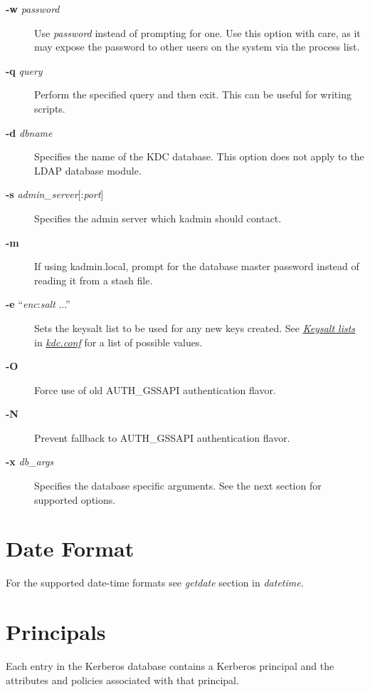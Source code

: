 \documentclass[letterpaper,10pt,english]{sphinxmanual}
\begin{document}
\begin{description}
\item[{\textbf{-w} \emph{password}}] \leavevmode
Use \emph{password} instead of prompting for one.  Use this option with
care, as it may expose the password to other users on the system
via the process list.

\item[{\textbf{-q} \emph{query}}] \leavevmode
Perform the specified query and then exit.  This can be useful for
writing scripts.

\item[{\textbf{-d} \emph{dbname}}] \leavevmode
Specifies the name of the KDC database.  This option does not
apply to the LDAP database module.

\item[{\textbf{-s} \emph{admin\_server}{[}:\emph{port}{]}}] \leavevmode
Specifies the admin server which kadmin should contact.

\item[{\textbf{-m}}] \leavevmode
If using kadmin.local, prompt for the database master password
instead of reading it from a stash file.

\item[{\textbf{-e} ``\emph{enc}:\emph{salt} ...''}] \leavevmode
Sets the keysalt list to be used for any new keys created.  See
{\hyperref[admin/conf_files/kdc_conf:keysalt-lists]{\emph{Keysalt lists}}} in {\hyperref[admin/conf_files/kdc_conf:kdc-conf-5]{\emph{kdc.conf}}} for a list of possible
values.

\item[{\textbf{-O}}] \leavevmode
Force use of old AUTH\_GSSAPI authentication flavor.

\item[{\textbf{-N}}] \leavevmode
Prevent fallback to AUTH\_GSSAPI authentication flavor.

\item[{\textbf{-x} \emph{db\_args}}] \leavevmode
Specifies the database specific arguments.  See the next section
for supported options.

\end{description}


\section{Date Format}
\label{admin/database:date-format}
For the supported date-time formats see \emph{getdate} section
in \emph{datetime}.


\section{Principals}
\label{admin/database:principals}
Each entry in the Kerberos database contains a Kerberos principal and
the attributes and policies associated with that principal.
\end{document}
